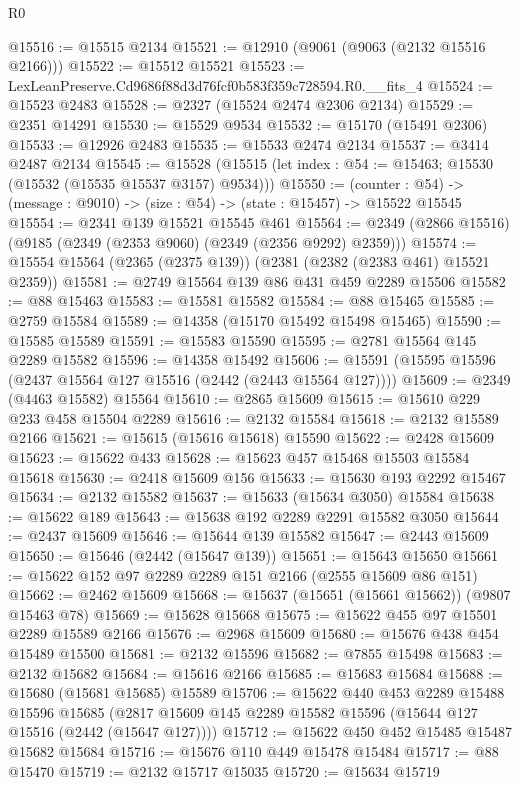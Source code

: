 \begin{lexlean}{R0}
\begin{coremodule}
@15516 := @15515 @2134
@15521 := @12910 (@9061 (@9063 (@2132 @15516 @2166)))
@15522 := @15512 @15521
@15523 := LexLeanPreserve.Cd9686f88d3d76fcf0b583f359c728594.R0.__fits_4
@15524 := @15523 @2483
@15528 := @2327 (@15524 @2474 @2306 @2134)
@15529 := @2351 @14291
@15530 := @15529 @9534
@15532 := @15170 (@15491 @2306)
@15533 := @12926 @2483
@15535 := @15533 @2474 @2134
@15537 := @3414 @2487 @2134
@15545 := @15528 (@15515 (let index : @54 := @15463; @15530 (@15532 (@15535 @15537 @3157) @9534)))
@15550 := (counter : @54) -> (message : @9010) -> (size : @54) -> (state : @15457) -> @15522 @15545
@15554 := @2341 @139 @15521 @15545 @461
@15564 := @2349 (@2866 @15516) (@9185 (@2349 (@2353 @9060) (@2349 (@2356 @9292) @2359)))
@15574 := @15554 @15564 (@2365 (@2375 @139)) (@2381 (@2382 (@2383 @461) @15521 @2359))
@15581 := @2749 @15564 @139 @86 @431 @459 @2289 @15506
@15582 := @88 @15463
@15583 := @15581 @15582
@15584 := @88 @15465
@15585 := @2759 @15584
@15589 := @14358 (@15170 @15492 @15498 @15465)
@15590 := @15585 @15589
@15591 := @15583 @15590
@15595 := @2781 @15564 @145 @2289 @15582
@15596 := @14358 @15492
@15606 := @15591 (@15595 @15596 (@2437 @15564 @127 @15516 (@2442 (@2443 @15564 @127))))
@15609 := @2349 (@4463 @15582) @15564
@15610 := @2865 @15609
@15615 := @15610 @229 @233 @458 @15504 @2289
@15616 := @2132 @15584
@15618 := @2132 @15589 @2166
@15621 := @15615 (@15616 @15618) @15590
@15622 := @2428 @15609
@15623 := @15622 @433
@15628 := @15623 @457 @15468 @15503 @15584 @15618
@15630 := @2418 @15609 @156
@15633 := @15630 @193 @2292 @15467
@15634 := @2132 @15582
@15637 := @15633 (@15634 @3050) @15584
@15638 := @15622 @189
@15643 := @15638 @192 @2289 @2291 @15582 @3050
@15644 := @2437 @15609
@15646 := @15644 @139 @15582
@15647 := @2443 @15609
@15650 := @15646 (@2442 (@15647 @139))
@15651 := @15643 @15650
@15661 := @15622 @152 @97 @2289 @2289 @151 @2166 (@2555 @15609 @86 @151)
@15662 := @2462 @15609
@15668 := @15637 (@15651 (@15661 @15662)) (@9807 @15463 @78)
@15669 := @15628 @15668
@15675 := @15622 @455 @97 @15501 @2289 @15589 @2166
@15676 := @2968 @15609
@15680 := @15676 @438 @454 @15489 @15500
@15681 := @2132 @15596
@15682 := @7855 @15498
@15683 := @2132 @15682
@15684 := @15616 @2166
@15685 := @15683 @15684
@15688 := @15680 (@15681 @15685) @15589
@15706 := @15622
    @440
    @453
    @2289
    @15488
    @15596
    @15685
    (@2817 @15609 @145 @2289 @15582 @15596 (@15644 @127 @15516 (@2442 (@15647 @127))))
@15712 := @15622 @450 @452 @15485 @15487 @15682 @15684
@15716 := @15676 @110 @449 @15478 @15484
@15717 := @88 @15470
@15719 := @2132 @15717 @15035
@15720 := @15634 @15719

\end{coremodule}
\end{lexlean}
